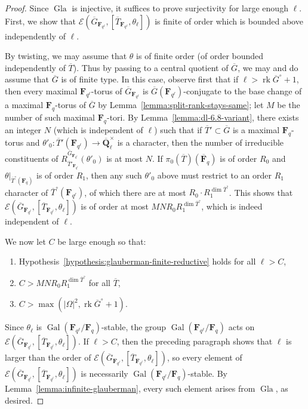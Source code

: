 \documentclass[reqno]{amsart}
\numberwithin{equation}{subsection}
\newcommand{\F}{\mathbf{F}}
\newcommand{\Q}{\mathbf{Q}}
\newcommand{\Gal}{\operatorname{Gal}}
\newcommand{\ol}[1]{\overline{#1}}
\newcommand{\co}{\colon}
\newcommand\cE{\mathcal{E}}
\DeclareMathOperator{\rk}{rk}
\DeclareMathOperator{\Gla}{Gla}
\theoremstyle{remark}
\numberwithin{equation}{subsection}
\numberwithin{figure}{subsection}
\begin{document}
\begin{proof}
    Since $\Gla$ is injective, it suffices to prove surjectivity for large enough $\ell$. First, we show that $\cE(\ol G_{\F_{q^\ell}}, [\ol T_{\F_{q^\ell}}, \theta_\ell])$ is finite of order which is bounded above independently of $\ell$.

    By twisting, we may assume that $\theta$ is of finite order (of order bounded independently of $\ol T$). Thus by passing to a central quotient of $\ol G$, we may and do assume that $\ol G$ is of finite type. In this case, observe first that if $\ell > \rk \ol G^\circ + 1$, then every maximal $\F_{q^\ell}$-torus of $\ol G_{\F_{q^\ell}}$ is $\ol G(\F_{q^\ell})$-conjugate to the base change of a maximal $\F_q$-torus of $\ol G$ by Lemma~\ref{lemma:split-rank-stays-same}; let $M$ be the number of such maximal $\F_q$-tori. By Lemma~\ref{lemma:dl-6.8-variant}, there exists an integer $N$ (which is independent of $\ell$) such that if $\ol T' \subset \ol G$ is a maximal $\F_q$-torus and $\theta'_0\co \ol T'(\F_{q^\ell}) \to \ol\Q_\ell^\times$ is a character, then the number of irreducible constituents of $R_{\ol T'_{\F_{q^\ell}}}^{\ol G_{\F_{q^\ell}}}(\theta'_0)$ is at most $N$. If $\pi_0(\ol T)(\ol\F_q)$ is of order $R_0$ and $\theta|_{\ol T^\circ(\F_q)}$ is of order $R_1$, then any such $\theta'_0$ above must restrict to an order $R_1$ character of $\ol T^\circ(\F_{q^\ell})$, of which there are at most $R_0 \cdot R_1^{\dim \ol T^\circ}$. This shows that $\cE(\ol G_{\F_{q^\ell}}, [\ol T_{\F_{q^\ell}}, \theta_\ell])$ is of order at most $MNR_0R_1^{\dim \ol T^\circ}$, which is indeed independent of $\ell$.

    We now let $C$ be large enough so that: 
    \begin{enumerate}
        \item Hypothesis~\ref{hypothesis:glauberman-finite-reductive} holds for all $\ell > C$,
        \item $C > MNR_0R_1^{\dim\ol T^\circ}$ for all $\ol T$,
        \item $C > \max(|\Omega|^2, \rk \ol G^\circ + 1)$.
    \end{enumerate}
    Since $\theta_\ell$ is $\Gal(\F_{q^\ell}/\F_q)$-stable, the group $\Gal(\F_{q^\ell}/\F_q)$ acts on $\cE(\ol G_{\F_{q^\ell}}, [\ol T_{\F_{q^\ell}},\theta_\ell])$. If $\ell > C$, then the preceding paragraph shows that $\ell$ is larger than the order of $\cE(\ol G_{\F_{q^\ell}}, [\ol T_{\F_{q^\ell}},\theta_\ell])$, so every element of $\cE(\ol G_{\F_{q^\ell}}, [\ol T_{\F_{q^\ell}},\theta_\ell])$ is necessarily $\Gal(\F_{q^\ell}/\F_q)$-stable. By Lemma~\ref{lemma:infinite-glauberman}, every such element arises from $\Gla$, as desired.
\end{proof}
\end{document}

